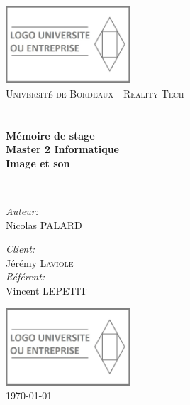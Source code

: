\begin{titlepage}
\begin{center}

\includegraphics[width=0.35\textwidth]{./logo}~\\[1cm]

\textsc{\LARGE Université de Bordeaux - Reality Tech}\\[1.5cm]

\textsc{\Large }\\[0.5cm]

\HRule \\[0.4cm]

{\huge \bfseries Mémoire de stage\\
				Master 2 Informatique\\
				Image et son\\}

\HRule \\[1.5cm]

\begin{minipage}{0.4\textwidth}
\begin{flushleft} \large
\emph{Auteur:}\\
Nicolas \textsc{PALARD}\\
\end{flushleft}
\end{minipage}
\begin{minipage}{0.4\textwidth}
\begin{flushright} \large
\emph{Client:} \\
Jérémy \textsc{Laviole}\\
\emph{Référent:} \\
Vincent \textsc{LEPETIT}
\end{flushright}
\end{minipage}

\vfill

\includegraphics[width=0.35\textwidth]{./logo}~\\[1cm]
{\large \today}

\end{center}
\end{titlepage}